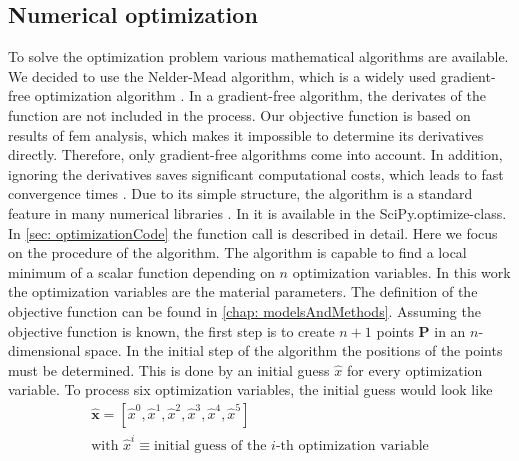 \subsection{Numerical optimization} \label{subsec: numericalOptimization}
To solve the optimization problem various mathematical algorithms are available. We decided to use the Nelder-Mead algorithm, which is a widely used gradient-free optimization algorithm \cite{gao_implementing_2012}. In a gradient-free algorithm, the derivates of the function are not included in the process. Our objective function is based on results of \acrshort{fem} analysis, which makes it impossible to determine its derivatives directly. Therefore, only gradient-free algorithms come into account. In addition, ignoring the derivatives saves significant computational costs, which leads to fast convergence times \cite{pham_comparative_2011}. Due to its simple structure, the algorithm is a standard feature in many numerical libraries \cite{singer_efficient_2004}. In  it is available in the SciPy.optimize-class. In \autoref{sec: optimizationCode} the function call is described in detail. Here we focus on the procedure of the algorithm. The algorithm is capable to find a local minimum of a scalar function depending on $n$ optimization variables. In this work the optimization variables are the material parameters. The definition of the objective function can be found in \autoref{chap: modelsAndMethods}. Assuming the objective function is known, the first step is to create $n+1$ points $\mathbf{P}$ in an $n$-dimensional space. In the initial step of the algorithm the positions of the points must be determined. This is done by an initial guess $\hat{x}$ for every optimization variable. To process six optimization variables, the initial guess would look like
\begin{gather*}
    \mathbf{\hat{x}} = [\hat{x}^0, \hat{x}^1, \hat{x}^2, \hat{x}^3, \hat{x}^4, \hat{x}^5] \\
    \text{with } \hat{x}^i \equiv \text{initial guess of the $i$-th optimization variable}
\end{gather*}

